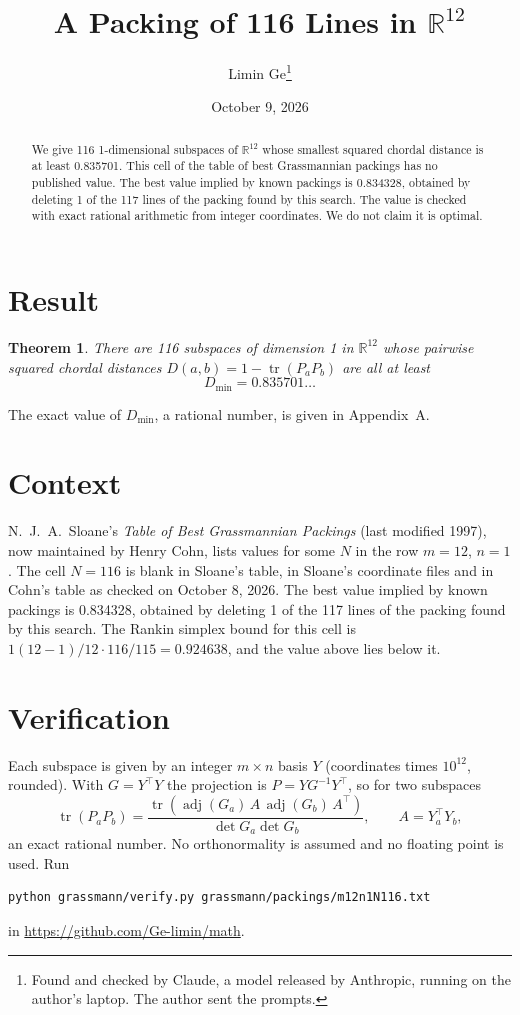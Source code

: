 \documentclass[11pt,a4paper]{article}
\title{A Packing of 116 Lines in $\mathbb{R}^{12}$}
\author{Limin Ge\thanks{Found and checked by Claude, a model released by Anthropic, running on the author's laptop. The author sent the prompts.}}
\date{October 9, 2026}
\newtheorem*{theorem}{Theorem}
\begin{document}
\maketitle
\begin{abstract}
We give 116 1-dimensional subspaces of $\mathbb{R}^{12}$ whose smallest squared chordal distance is at least 0.835701. This cell of the table of best Grassmannian packings has no published value. The best value implied by known packings is 0.834328, obtained by deleting 1 of the 117 lines of the packing found by this search. The value is checked with exact rational arithmetic from integer coordinates. We do not claim it is optimal.
\end{abstract}

\section{Result}
\begin{theorem}
There are 116 subspaces of dimension 1 in $\mathbb{R}^{12}$ whose pairwise squared chordal distances $D(a,b) = 1 - \operatorname{tr}(P_aP_b)$ are all at least
\[ D_{\min} = 0.835701\ldots \]
\end{theorem}
The exact value of $D_{\min}$, a rational number, is given in Appendix~A.


\section{Context}
N.~J.~A.~Sloane's \emph{Table of Best Grassmannian Packings} (last modified 1997), now maintained by Henry Cohn, lists values for some $N$ in the row $m=12$, $n=1$. The cell $N=116$ is blank in Sloane's table, in Sloane's coordinate files and in Cohn's table as checked on October 8, 2026. The best value implied by known packings is 0.834328, obtained by deleting 1 of the 117 lines of the packing found by this search. The Rankin simplex bound for this cell is $1(12-1)/12\cdot 116/115 = 0.924638$, and the value above lies below it.


\section{Verification}
Each subspace is given by an integer $m\times n$ basis $Y$ (coordinates times $10^{12}$, rounded). With $G=Y^\top Y$ the projection is $P=YG^{-1}Y^\top$, so for two subspaces
\[ \operatorname{tr}(P_aP_b)=\frac{\operatorname{tr}(\operatorname{adj}(G_a)\,A\,\operatorname{adj}(G_b)\,A^\top)}{\det G_a\det G_b},\qquad A=Y_a^\top Y_b, \]
an exact rational number. No orthonormality is assumed and no floating point is used. Run
\begin{verbatim}
python grassmann/verify.py grassmann/packings/m12n1N116.txt
\end{verbatim}
in \url{https://github.com/Ge-limin/math}.
\end{document}
